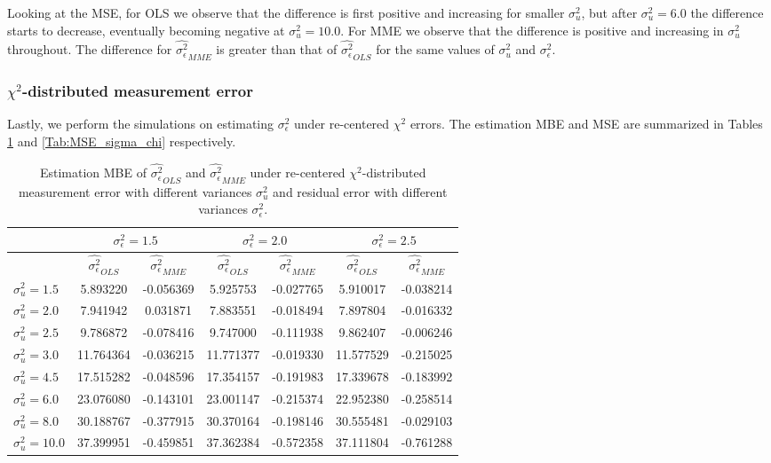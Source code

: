 \documentclass{article}
\begin{document}
Looking at the MSE,
for OLS we observe that the difference is first positive and increasing for smaller $\sigma^2_u$, but after $\sigma^2_u=6.0$ the difference starts to decrease,
eventually becoming negative at $\sigma^2_u = 10.0$.
For MME we observe that the difference is positive and increasing in $\sigma^2_u$ throughout.
The difference for $\hat{\sigma^2_\epsilon}_{MME}$ is greater than that of $\hat{\sigma^2_\epsilon}_{OLS}$ for the same values of $\sigma^2_u$ and $\sigma^2_\epsilon$.

\subsubsection{$\chi^2$-distributed measurement error}

Lastly, we perform the simulations on estimating $\sigma^2_\epsilon$ under re-centered $\chi^2$ errors.
The estimation MBE and MSE are summarized in Tables \ref{Tab:MBE_sigma_chi} and \ref{Tab:MSE_sigma_chi} respectively.

\begin{table}[ht]
    \centering
    \caption{Estimation MBE of $\hat{\sigma^2_\epsilon}_{OLS}$ and $\hat{\sigma^2_\epsilon}_{MME}$ under re-centered $\chi^2$-distributed measurement error with different variances $\sigma^2_u$ and residual error with different variances $\sigma^2_\epsilon$.}
    \label{Tab:MBE_sigma_chi}
    \begin{tabular}[t]{lcccccc}
        \hline
        &\multicolumn{2}{c}{$\sigma^2_\epsilon=1.5$}&\multicolumn{2}{c}{$\sigma^2_\epsilon=2.0$}&\multicolumn{2}{c}{$\sigma^2_\epsilon=2.5$}\\
        \hline
        &$\hat{\sigma^2_\epsilon}_{OLS}$&$\hat{\sigma^2_\epsilon}_{MME}$&$\hat{\sigma^2_\epsilon}_{OLS}$&
        $\hat{\sigma^2_\epsilon}_{MME}$&$\hat{\sigma^2_\epsilon}_{OLS}$&$\hat{\sigma^2_\epsilon}_{MME}$\\
        \hline
        $\sigma^2_u = 1.5$&5.893220&-0.056369&5.925753&-0.027765&5.910017&-0.038214\\
        $\sigma^2_u = 2.0$&7.941942&0.031871&7.883551&-0.018494&7.897804&-0.016332\\
        $\sigma^2_u = 2.5$&9.786872&-0.078416&9.747000&-0.111938&9.862407&-0.006246\\
        $\sigma^2_u = 3.0$&11.764364&-0.036215&11.771377&-0.019330&11.577529&-0.215025\\
        $\sigma^2_u = 4.5$&17.515282&-0.048596&17.354157&-0.191983&17.339678&-0.183992\\
        $\sigma^2_u = 6.0$&23.076080&-0.143101&23.001147&-0.215374&22.952380&-0.258514\\
        $\sigma^2_u = 8.0$&30.188767&-0.377915&30.370164&-0.198146&30.555481&-0.029103\\
        $\sigma^2_u = 10.0$&37.399951&-0.459851&37.362384&-0.572358&37.111804&-0.761288\\
        \hline
    \end{tabular}
\end{table}
\end{document}
